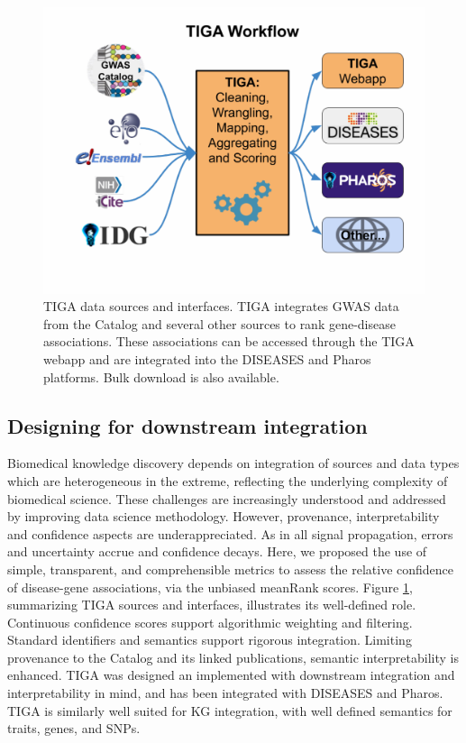 \begin{figure}
	\includegraphics[width=\textwidth]{figures/tiga/FIG09_TIGA_Workflow.jpg}
	\caption{TIGA data sources and interfaces. TIGA integrates GWAS data from the Catalog and several other sources to rank gene-disease associations. These associations can be accessed through the TIGA webapp and are integrated into the DISEASES\cite{Pletscher-Frankild2015-oo} and Pharos platforms. Bulk download is also available.}
	\label{fig:TIGA_09}
\end{figure}

\subsection{Designing for downstream integration}

Biomedical knowledge discovery depends on integration of sources and data types which are heterogeneous in the extreme, reflecting the underlying complexity of biomedical science. These challenges are increasingly understood and addressed by improving data science methodology. However, provenance, interpretability and confidence aspects are underappreciated. As in all signal propagation, errors and uncertainty accrue and confidence decays. Here, we proposed the use of simple, transparent, and comprehensible metrics to assess the relative confidence of disease-gene associations, via the unbiased meanRank scores. Figure \ref{fig:TIGA_09}, summarizing TIGA sources and interfaces, illustrates its well-defined role. Continuous confidence scores support algorithmic weighting and filtering. Standard identifiers and semantics support rigorous integration. Limiting provenance to the Catalog and its linked publications, semantic interpretability is enhanced. TIGA was designed an implemented with downstream integration and interpretability in mind, and has been integrated with DISEASES and Pharos. TIGA is similarly well suited for KG integration, with well defined semantics for traits, genes, and SNPs.

